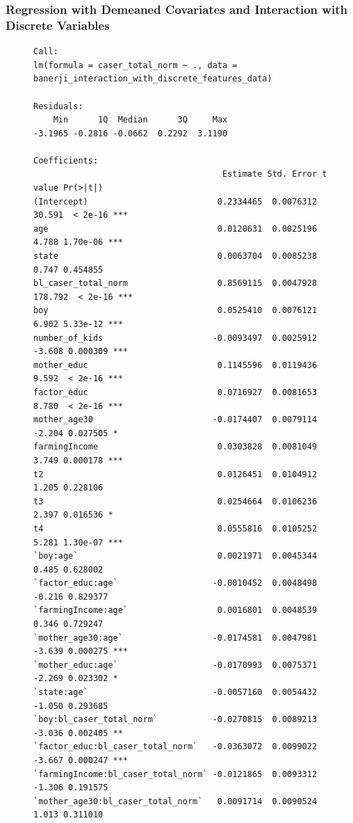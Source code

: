 \documentclass{article}
\begin{document}
\subsubsection*{Regression with Demeaned Covariates and Interaction with Discrete Variables}
\begin{figure}[H]
\begin{lstlisting}[style=RstyleComment, caption=Regression with Demeaned Covariates and Interaction with Discrete Variables]
Call:
lm(formula = caser_total_norm ~ ., data = banerji_interaction_with_discrete_features_data)

Residuals:
    Min      1Q  Median      3Q     Max 
-3.1965 -0.2816 -0.0662  0.2292  3.1190 

Coefficients:
                                      Estimate Std. Error t value Pr(>|t|)    
(Intercept)                          0.2334465  0.0076312  30.591  < 2e-16 ***
age                                  0.0120631  0.0025196   4.788 1.70e-06 ***
state                                0.0063704  0.0085238   0.747 0.454855    
bl_caser_total_norm                  0.8569115  0.0047928 178.792  < 2e-16 ***
boy                                  0.0525410  0.0076121   6.902 5.33e-12 ***
number_of_kids                      -0.0093497  0.0025912  -3.608 0.000309 ***
mother_educ                          0.1145596  0.0119436   9.592  < 2e-16 ***
factor_educ                          0.0716927  0.0081653   8.780  < 2e-16 ***
mother_age30                        -0.0174407  0.0079114  -2.204 0.027505 *  
farmingIncome                        0.0303828  0.0081049   3.749 0.000178 ***
t2                                   0.0126451  0.0104912   1.205 0.228106    
t3                                   0.0254664  0.0106236   2.397 0.016536 *  
t4                                   0.0555816  0.0105252   5.281 1.30e-07 ***
`boy:age`                            0.0021971  0.0045344   0.485 0.628002    
`factor_educ:age`                   -0.0010452  0.0048498  -0.216 0.829377    
`farmingIncome:age`                  0.0016801  0.0048539   0.346 0.729247    
`mother_age30:age`                  -0.0174581  0.0047981  -3.639 0.000275 ***
`mother_educ:age`                   -0.0170993  0.0075371  -2.269 0.023302 *  
`state:age`                         -0.0057160  0.0054432  -1.050 0.293685    
`boy:bl_caser_total_norm`           -0.0270815  0.0089213  -3.036 0.002405 ** 
`factor_educ:bl_caser_total_norm`   -0.0363072  0.0099022  -3.667 0.000247 ***
`farmingIncome:bl_caser_total_norm` -0.0121865  0.0093312  -1.306 0.191575    
`mother_age30:bl_caser_total_norm`   0.0091714  0.0090524   1.013 0.311010    

\end{lstlisting}
\end{figure}
\end{document}
